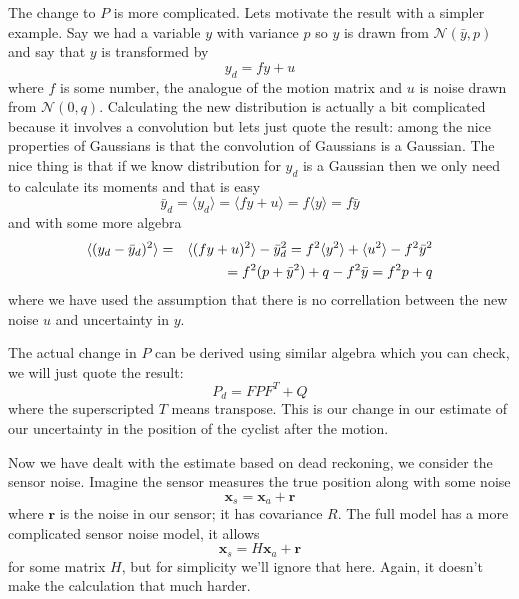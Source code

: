 \documentclass[12pt]{article}
\begin{document}
The change to $P$ is more complicated. Lets motivate the result with a
simpler example. Say we had a variable $y$ with variance $p$ so $y$ is
drawn from $\mathcal{N}(\bar{y},p)$ and say that $y$ is transformed by 
\begin{equation}
y_d=fy+u
\end{equation}
where $f$ is some number, the analogue of the motion matrix and $u$ is
noise drawn from $\mathcal{N}(0,q)$. Calculating the new distribution
is actually a bit complicated because it involves a convolution but
lets just quote the result: among the nice properties of Gaussians is
that the convolution of Gaussians is a Gaussian. The nice thing is
that if we know distribution for $y_d$ is a Gaussian then we only need
to calculate its moments and that is easy
\begin{equation}
\bar{y}_d=\langle y_d\rangle =\langle fy+u\rangle=f\langle y\rangle=f\bar{y}
\end{equation}
and with some more algebra
\begin{eqnarray}
\langle (y_d-\bar{y}_d)^2\rangle &=&\langle (fy+u)^2 \rangle-\bar{y}_d^2=f^2\langle y^2\rangle+\langle u^2\rangle -f^2\bar{y}^2\cr
&&=f^2(p+\bar{y}^2)+q-f^2\bar{y}=f^2p+q
\end{eqnarray}
where we have used the assumption that there is no correllation
between the new noise $u$ and uncertainty in $y$.

The actual change in $P$ can be derived using similar algebra which
you can check, we will just quote the result:
\begin{equation}
P_d=FPF^T+Q
\end{equation}
where the superscripted $T$ means transpose. This is our change in our
estimate of our uncertainty in the position of the cyclist after the
motion.

Now we have dealt with the estimate based on dead reckoning, we
consider the sensor noise. Imagine the sensor measures the true
position along with some noise
\begin{equation}
\mathbf{x}_s=\mathbf{x}_a+\mathbf{r}
\end{equation}
where $\mathbf{r}$ is the noise in our sensor; it has covariance $R$. The full model has a more complicated sensor noise model, it allows
\begin{equation}
\mathbf{x}_s=H\mathbf{x}_a+\mathbf{r}
\end{equation}
for some matrix $H$, but for simplicity we'll ignore that here. Again,
it doesn't make the calculation that much harder. 
\end{document}
